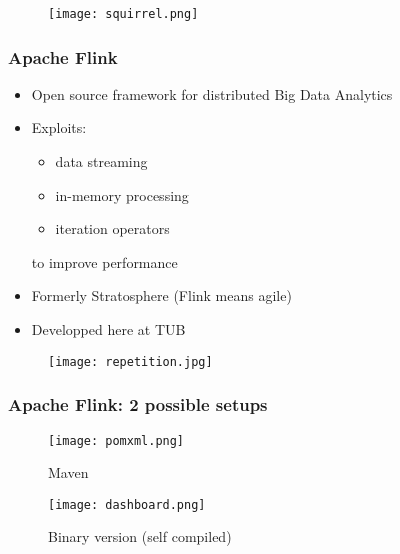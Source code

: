 \begin{frame}
\begin{figure}
	\centering
	\texttt{[image: squirrel.png]}
	\caption*{\cite{squirrel}}
\end{figure}
\end{frame}

\begin{frame}
\frametitle{Apache Flink}
\begin{itemize}
\item Open source framework for distributed Big Data Analytics
\item Exploits:
	\begin{itemize}
	\item data streaming
	\item in-memory processing
	\item iteration operators
	\end{itemize}
to improve performance
\item Formerly Stratosphere (Flink means agile)
\item Developped here at TUB
\end{itemize}
\end{frame}

\begin{frame}
\begin{figure}
	\centering
	\texttt{[image: repetition.jpg]}
	\caption*{\cite{repetition}}
\end{figure}
\end{frame}

\begin{frame}
\frametitle{Apache Flink: 2 possible setups}

\begin{minipage}[l]{0.5\textwidth}
\begin{figure}
	\centering
	\texttt{[image: pomxml.png]}
	\caption{Maven}
\end{figure}
\end{minipage}
\begin{minipage}[l]{0.49\textwidth}
\begin{figure}
	\centering
	\texttt{[image: dashboard.png]}
	\caption{Binary version (self compiled)}
\end{figure}
\end{minipage}
\end{frame}
